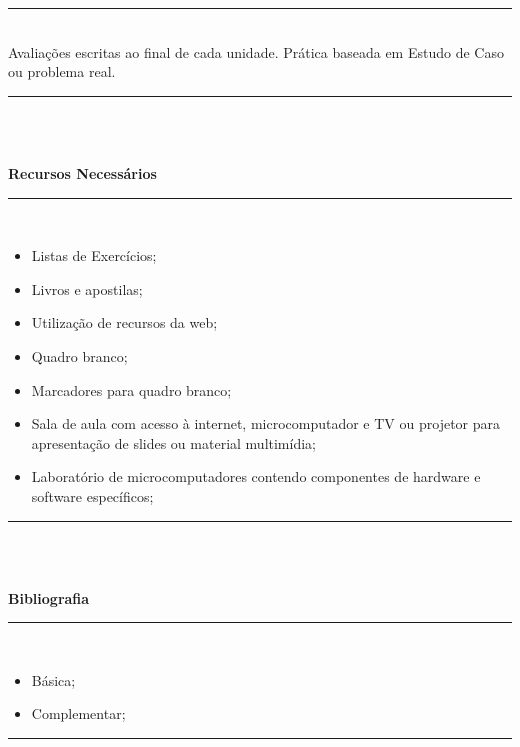 \noindent\rule{16.2cm}{0.4pt}
\\
   Avaliações escritas ao final de cada unidade. Prática baseada em Estudo de Caso ou problema real.\\
\noindent\rule{16.2cm}{0.4pt}\\
\\
\begin{center}\textbf{Recursos Necessários}\end{center}
\noindent\rule{16.2cm}{0.4pt}
\\
\begin{itemize} 
  \item Listas de Exercícios;
  \item Livros e apostilas;
  \item Utilização de recursos da web;
  \item Quadro branco;
  \item Marcadores para quadro branco;
  \item Sala de aula com acesso à internet, microcomputador e TV ou projetor para apresentação de slides ou material multimídia;
  \item Laboratório de microcomputadores contendo componentes de hardware e software específicos;
\end{itemize}
\noindent\rule{16.2cm}{0.4pt}\\
\\
\begin{center}\textbf{Bibliografia}\end{center}
\noindent\rule{16.2cm}{0.4pt}
\\
\begin{itemize} 
  \item Básica;
  \item Complementar;
\end{itemize}
\noindent\rule{16.2cm}{0.4pt}\\
\\
